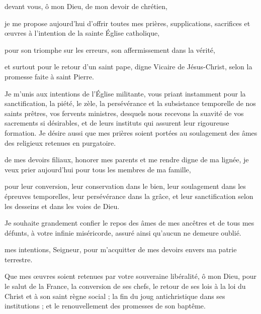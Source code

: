  devant vous, ô mon Dieu, de mon devoir de chrétien,

je me propose aujourd’hui d’offrir toutes mes prières, supplications, sacrifices et œuvres à l’intention de la sainte Église catholique,

pour son triomphe sur les erreurs, son affermissement dans la vérité,

et surtout pour le retour d’un saint pape, digne Vicaire de Jésus-Christ, selon la promesse faite à saint Pierre.

Je m’unis aux intentions de l’Église militante, vous priant instamment pour la sanctification, la piété, le zèle, la persévérance et la subsistance temporelle de nos saints prêtres, vos fervents ministres, desquels nous recevons la suavité de vos sacrements si désirables, et de leurs instituts qui assurent leur rigoureuse formation. Je désire aussi que mes prières soient portées au soulagement des âmes des religieux retenues en purgatoire.

\culdelampe

 de mes devoirs filiaux, honorer mes parents et me rendre digne de ma lignée, je veux prier aujourd’hui pour tous les membres de ma famille,

pour leur conversion, leur conservation dans le bien, leur soulagement dans les épreuves temporelles, leur persévérance dans la grâce, et leur sanctification selon les desseins et dans les voies de Dieu.

Je souhaite grandement confier le repos des âmes de mes ancêtres et de tous mes défunts, à votre infinie miséricorde, assuré ainsi qu’aucun ne demeure oublié.

\culdelampe

 mes intentions, Seigneur, pour m’acquitter de mes devoirs envers ma patrie terrestre.

Que mes œuvres soient retenues par votre souveraine libéralité, ô mon Dieu, pour le salut de la France, la conversion de ses chefs, le retour de ses lois à la loi du Christ et à son saint règne social ; la fin du joug antichristique dans ses institutions ; et le renouvellement des promesses de son baptême.

